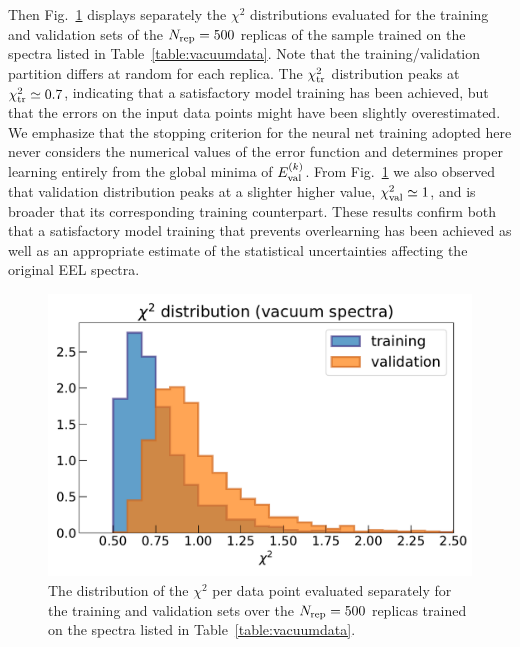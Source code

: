 Then Fig.~\ref{fig:chi2_distributions} displays separately the $\chi^2$  distributions
evaluated for the training and validation sets
of the $N_{\rm rep}=500$ replicas of the sample trained on the spectra
listed in Table~\ref{table:vacuumdata}.
%
Note that the training/validation partition differs at random for each replica.
%
The $\chi^2_{\rm tr}$ distribution peaks at $\chi^2_{\rm tr}\simeq 0.7$,
indicating that a satisfactory model training
has been achieved, but that the errors on the input data points might have
been slightly overestimated.
%
We emphasize that the stopping criterion for the neural net training adopted here never considers
the numerical values of the error function and determines proper learning entirely from
the global minima of $E_{\rm val}^{(k)}$.
%
From Fig.~\ref{fig:chi2_distributions} we also observed that  validation
distribution peaks at
a slighter higher value, $\chi^2_{\rm val}\simeq 1$, and
is broader that its corresponding training counterpart.
%
These results confirm both that a satisfactory model training that prevents overlearning
has been achieved as well as an appropriate estimate of the statistical uncertainties
affecting the original EEL spectra.

\begin{figure}[t]
    \centering
    \includegraphics[width=120mm]{plots/chi2_distributions.pdf}
    \caption{\small The distribution of the $\chi^2$ per data point evaluated
      separately for the training and validation sets over
      the $N_{\rm rep}=500$ replicas trained on the spectra
      listed in Table~\ref{table:vacuumdata}.}
    \label{fig:chi2_distributions}
\end{figure}

